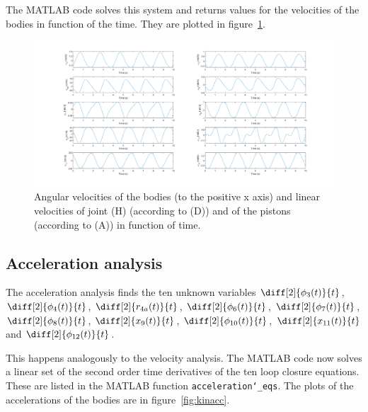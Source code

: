 \documentclass[a4paper]{article}
\begin{document}
The MATLAB code solves this system and returns values for the velocities of the bodies in function of the time. They are plotted in figure~\ref{fig:kinvel}.

\begin{figure}[h]
	\centering
	
	\includegraphics[width = \textwidth]{kinvel.png}
	
	\caption{Angular velocities of the bodies (to the positive x axis) and linear velocities of joint (H) (according to (D)) and of the pistons (according to (A)) in function of time.}
	\label{fig:kinvel}
	
\end{figure}

\subsection{Acceleration analysis}

The acceleration analysis finds the ten unknown variables \(\diff[2]{\phi_3(t)}{t}\), \(\diff[2]{\phi_4(t)}{t}\), \(\diff[2]{r_{4a}(t)}{t}\), \(\diff[2]{\phi_6(t)}{t}\), \(\diff[2]{\phi_7(t)}{t}\), \(\diff[2]{\phi_8(t)}{t}\), \(\diff[2]{x_9(t)}{t}\), \(\diff[2]{\phi_{10}(t)}{t}\), \(\diff[2]{x_{11}(t)}{t}\) and \(\diff[2]{\phi_{12}(t)}{t}\).

This happens analogously to the velocity analysis. The MATLAB code now solves a linear set of the second order time derivatives of the ten loop closure equations. These are listed in the MATLAB function \texttt{acceleration\char`_eqs}. The plots of the accelerations of the bodies are in figure~\ref{fig:kinacc}.
\end{document}
